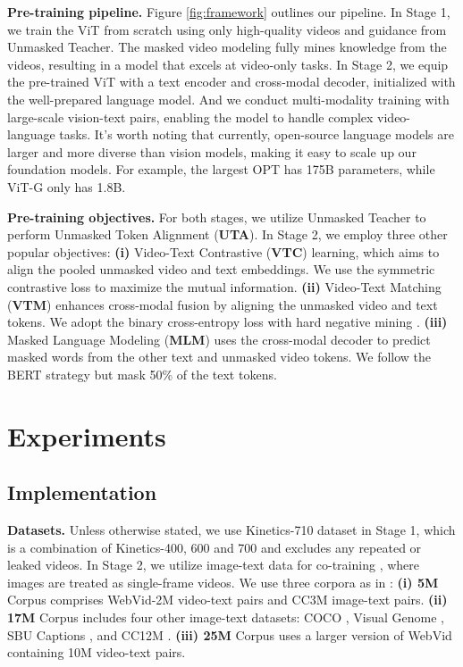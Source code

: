 \documentclass[10pt,twocolumn,letterpaper]{article}
\begin{document}
\textbf{Pre-training pipeline.}
Figure \ref{fig:framework} outlines our pipeline.
In Stage 1, 
we train the ViT from scratch using only high-quality videos and guidance from Unmasked Teacher. 
The masked video modeling fully mines knowledge from the videos, 
resulting in a model that excels at video-only tasks.
In Stage 2, 
we equip the pre-trained ViT with a text encoder and cross-modal decoder,
initialized with the well-prepared language model. 
And we conduct multi-modality training with large-scale vision-text pairs, 
enabling the model to handle complex video-language tasks.
It's worth noting that currently, 
open-source language models are larger and more diverse than vision models,
making it easy to scale up our foundation models. 
For example, 
the largest OPT \cite{opt} has 175B parameters, 
while ViT-G \cite{Zhai2021ScalingVT} only has 1.8B.


\textbf{Pre-training objectives.}
For both stages, 
we utilize Unmasked Teacher to perform Unmasked Token Alignment (\textbf{UTA}). 
In Stage 2, 
we employ three other popular objectives:
\textbf{(i)} Video-Text Contrastive (\textbf{VTC}) learning, which aims to align the pooled unmasked video and text embeddings. 
We use the symmetric contrastive loss \cite{bain2021frozen} to maximize the mutual information.
\textbf{(ii)} Video-Text Matching (\textbf{VTM}) enhances cross-modal fusion by aligning the unmasked video and text tokens. 
We adopt the binary cross-entropy loss with hard negative mining \cite{li2021align,lei2022revealing}.
\textbf{(iii)} Masked Language Modeling (\textbf{MLM}) uses the cross-modal decoder to predict masked words from the other text and unmasked video tokens. 
We follow the BERT \cite{devlin2018bert} strategy but mask 50\% of the text tokens. \section{Experiments}
\label{sec_exp}

\subsection{Implementation}

\textbf{Datasets.}
Unless otherwise stated,
we use Kinetics-710 dataset \cite{uniformerv2} in Stage 1, which is a combination of Kinetics-400, 600 and 700 \cite{k400,k600,k700} and excludes any repeated or leaked videos.
In Stage 2, 
we utilize image-text data for co-training \cite{wang2022all,lei2022revealing,wang2022omnivl},
where images are treated as single-frame videos. 
We use three corpora as in \cite{Cheng2022VindLUAR}:
\textbf{(i) 5M} Corpus comprises WebVid-2M \cite{bain2021frozen} video-text pairs and CC3M \cite{sharma2018conceptual} image-text pairs.
\textbf{(ii) 17M} Corpus includes four other image-text datasets: COCO \cite{lin2014microsoft}, Visual Genome \cite{krishna2017visual}, SBU Captions \cite{ordonez2011im2text}, and CC12M \cite{changpinyo2021conceptual}.
\textbf{(iii) 25M} Corpus uses a larger version of WebVid containing 10M video-text pairs.
\end{document}
